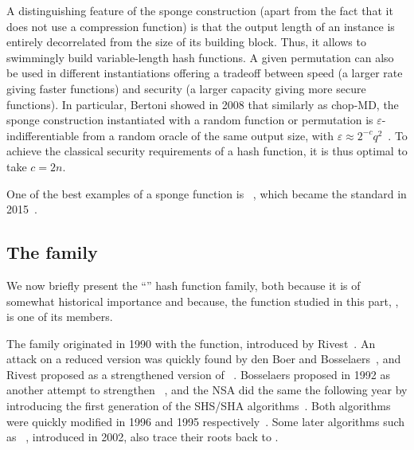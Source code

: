 A distinguishing feature of the sponge construction (apart from the fact that it does not use a compression function) is that the output length of an instance is entirely decorrelated from the size of its building
block. Thus, it allows to swimmingly build variable-length hash functions. A given permutation can also be used in different instantiations offering a tradeoff between speed (a larger rate giving
faster functions) and security (a larger capacity giving more secure functions).
In particular, Bertoni \etal showed in 2008 that similarly as chop-MD, the sponge construction instantiated with a random function or permutation is $\varepsilon$-indifferentiable from a random oracle
of the same output size, with $\varepsilon \approx 2^{-c}q^2$~\cite{DBLP:conf/eurocrypt/BertoniDPA08}. To achieve the classical security requirements of a hash function, it is thus optimal to take $c = 2n$.

One of the best examples of a sponge function is \keccak~\cite{KeccakReference}, which became the \shathree standard in 2015~\cite{Nist-SHA3}. 

\subsection{The \mdsha family}
We now briefly present the ``\mdsha'' hash function family, both because it is of somewhat historical importance and because, the function studied in this part, \shaone, is one of its members.

The family originated in 1990 with the \mdfour function, introduced by Rivest~\cite{Rivest-md4}. An attack on a reduced version was quickly found by den Boer and Bosselaers~\cite{DBLP:conf/crypto/BoerB91},
and Rivest proposed \mdfive as a strengthened version of \mdfour~\cite{Rivest-md5}. Bosselaers proposed \ripemd in 1992 as another attempt to strengthen \mdfour~\cite[Chap. 3]{DBLP:books/sp/BosselaersP95},
and the NSA did the same the following year by introducing the first generation of the SHS/SHA algorithms~\cite{Nist-SHA0}. Both algorithms were quickly modified in 1996 and 1995 respectively~\cite{DBLP:conf/fse/DobbertinBP96,Nist-SHA1}.
Some later algorithms such as \shatwo~\cite{Nist-SHA}, introduced in 2002, also trace their roots back to \mdfour.

